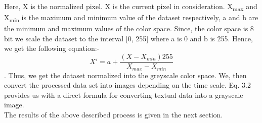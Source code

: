 Here, X is the normalized pixel. X is the current pixel in
consideration. X\textsubscript{max} and X\textsubscript{min} is the maximum and minimum
value of the dataset respectively, a and b are the minimum and
maximum values of the color space. Since, the color space is
8 bit we scale the dataset to the interval [0, 255] where a is 0
and b is 255. Hence, we get the following equation:-
\begin{equation} X'=a+ \frac{(X- X_{min})255}{X_{max} - X_{min}} \end{equation}.
Thus, we get the dataset normalized into the greyscale color
space. We, then convert the processed data set into images
depending on the time scale. Eq. 3.2 provides us with a direct
formula for converting textual data into a grayscale image.\\
The results of the above described process is given in the next section.